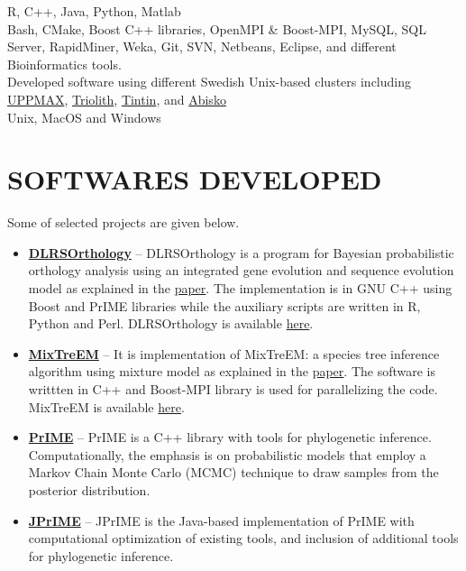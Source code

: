 \documentclass[margin, 10pt]{res} %
\begin{document}
\begin{resume}
{\bf \color{Brown}{Languages:}} 
R, C++, Java, Python, Matlab \\
{\bf \color{Brown}{Misc Tools:}} Bash, CMake, Boost C++ libraries, OpenMPI \& Boost-MPI, MySQL, SQL Server, RapidMiner, Weka, Git, SVN, Netbeans, Eclipse, and different Bioinformatics tools. \\
{\bf \color{Brown}{HPC Clusters:}} Developed software using different Swedish Unix-based clusters including \href{http://www.uppmax.uu.se/}{UPPMAX}, \href{https://www.nsc.liu.se/systems/triolith/}{Triolith}, \href{http://www.uppmax.uu.se/}{Tintin}, and \href{http://www.hpc2n.umu.se/resources/abisko}{Abisko} \\
{\bf \color{Brown}{Operating Systems:}} Unix, MacOS and Windows 


\section{SOFTWARES DEVELOPED} 
Some of selected projects are given below.
\begin{itemize}
\item \textbf{\href{http://prime.scilifelab.se/dlrsorthology/}{DLRSOrthology}} -- DLRSOrthology is a program for Bayesian probabilistic orthology analysis using an integrated gene evolution and sequence evolution model as explained in the \href{https://doi.org/10.1093/sysbio/syv044}{paper}. The implementation is in GNU C++ using Boost and PrIME libraries while the auxiliary scripts are written in R, Python and Perl. DLRSOrthology is available \href{https://bitbucket.org/ikramu/dlrsorthology}{here}.
\item \textbf{\href{http://prime.scilifelab.se/mixtreem/}{MixTreEM}} -- It is implementation of MixTreEM: a species tree inference algorithm using mixture model as explained in the \href{https://doi.org/10.1093/molbev/msv115}{paper}. The software is writtten in C++ and Boost-MPI library is used for parallelizing the code. MixTreEM is available \href{https://bitbucket.org/ikramu/mixtreem}{here}.
\item \textbf{\href{http://prime.scilifelab.se/}{PrIME}} -- PrIME is a C++ library with tools for phylogenetic inference. Computationally, the emphasis is on probabilistic models that employ a Markov Chain Monte Carlo (MCMC) technique to draw samples from the posterior distribution.
\item \textbf{\href{https://code.google.com/p/jprime/}{JPrIME}} -- JPrIME is the Java-based implementation of PrIME with computational optimization of existing tools, and inclusion of additional tools for phylogenetic inference.
\end{itemize}


\end{resume}
\end{document}
